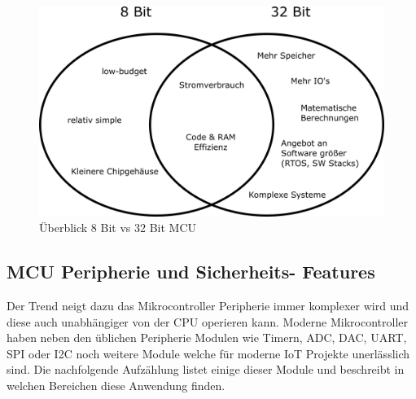 \documentclass[MES,Master,ngerman]{twbook}%
\begin{document}
\begin{figure}[h]
	\centering
	\includegraphics[scale=0.6]{../Grafiken/8_32_fazit.png}
	\caption{Überblick 8 Bit vs 32 Bit MCU}
	\label{fig:3_5}
\end{figure}

\subsection{MCU Peripherie und Sicherheits- Features}
Der Trend neigt dazu das Mikrocontroller Peripherie immer komplexer wird und diese auch unabhängiger von der CPU operieren kann. Moderne Mikrocontroller haben neben den üblichen Peripherie Modulen wie Timern, ADC, DAC, UART, SPI oder I2C noch weitere Module welche für moderne IoT Projekte unerlässlich sind. Die nachfolgende Aufzählung listet einige dieser Module und beschreibt in welchen Bereichen diese Anwendung finden.
\end{document}
